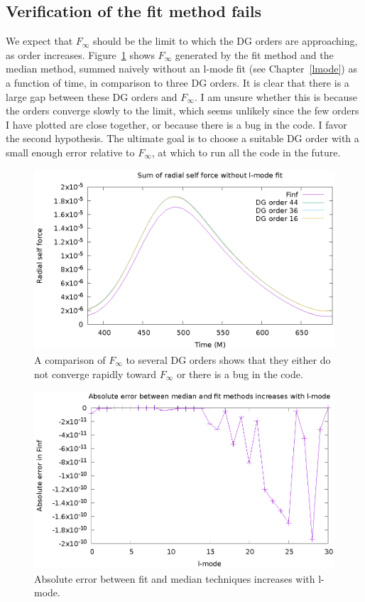 \subsection{Verification of the fit method fails}

We expect that $F_\infty$ should be the limit to which the DG orders are approaching, as order increases. Figure~\ref{limit} shows $F_\infty$ generated by the fit method and the median method, summed naively without an l-mode fit (see Chapter~\ref{lmode}) as a function of time, in comparison to three DG orders. It is clear that there is a large gap between these DG orders and $F_\infty$. I am unsure whether this is because the orders converge slowly to the limit, which seems unlikely since the few orders I have plotted are close together, or because there is a bug in the code. I favor the second hypothesis. The ultimate goal is to choose a suitable DG order with a small enough error relative to $F_\infty$, at which to run all the code in the future.

\begin{figure}
\includegraphics{unextrapsumcompareDG}
\caption{A comparison of $F_\infty$ to several DG orders shows that they either do not converge rapidly toward $F_\infty$ or there is a bug in the code.}
\label{limit}
\end{figure}


\begin{figure}
  \includegraphics{absErrorIncreaseslmode}
  \caption{Absolute error between fit and median techniques increases with l-mode.}
\end{figure}



